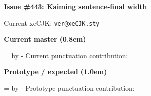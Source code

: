 \documentclass{article}
\newcommand\measurement[2]{%
  \dimen0=\wd#1\relax
  \advance\dimen0 by -\wd\basebox\relax
  #2 punctuation contribution: \texttt{\the\dimen0}\par
}
\begin{document}
{\Large\bfseries Issue \#443: Kaiming sentence-final width}\par
Current xeCJK: \texttt{\csname ver@xeCJK.sty\endcsname}

\bigskip
\fontsize{40}{48}\selectfont
\sbox{}
\sbox{}
\sbox{}

\normalsize
\textcolor{red!70!black}{\bfseries Current master (0.8em)}\par
\fbox{\usebox\currentbox}\par
\measurement\currentbox{Current}

\medskip
\textcolor{teal!70!black}{\bfseries Prototype / expected (1.0em)}\par
\fbox{\usebox\prototypebox}\par
\measurement\prototypebox{Prototype}
\end{document}
